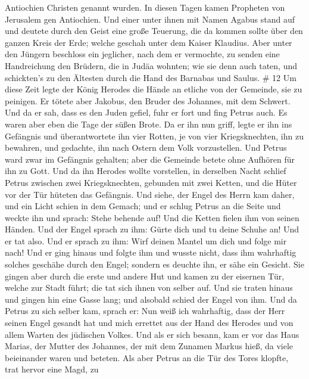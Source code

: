 Antiochien Christen genannt wurden.  In diesen Tagen kamen
Propheten von Jerusalem gen Antiochien.  Und einer unter
ihnen mit Namen Agabus stand auf und deutete durch den Geist eine große
Teuerung, die da kommen sollte über den ganzen Kreis der Erde; welche
geschah unter dem Kaiser Klaudius.  Aber unter den Jüngern
beschloss ein jeglicher, nach dem er vermochte, zu senden eine
Handreichung den Brüdern, die in Judäa wohnten;  wie sie
denn auch taten, und schickten's zu den Ältesten durch die Hand des
Barnabas und Saulus. \# 12  Um diese Zeit legte der König
Herodes die Hände an etliche von der Gemeinde, sie zu peinigen.
 Er tötete aber Jakobus, den Bruder des Johannes, mit dem
Schwert.  Und da er sah, dass es den Juden gefiel, fuhr er
fort und fing Petrus auch. Es waren aber eben die Tage der süßen Brote.
 Da er ihn nun griff, legte er ihn ins Gefängnis und
überantwortete ihn vier Rotten, je von vier Kriegsknechten, ihn zu
bewahren, und gedachte, ihn nach Ostern dem Volk vorzustellen.
 Und Petrus ward zwar im Gefängnis gehalten; aber die
Gemeinde betete ohne Aufhören für ihn zu Gott.  Und da ihn
Herodes wollte vorstellen, in derselben Nacht schlief Petrus zwischen
zwei Kriegsknechten, gebunden mit zwei Ketten, und die Hüter vor der Tür
hüteten das Gefängnis.  Und siehe, der Engel des Herrn kam
daher, und ein Licht schien in dem Gemach; und er schlug Petrus an die
Seite und weckte ihn und sprach: Stehe behende auf! Und die Ketten
fielen ihm von seinen Händen.  Und der Engel sprach zu ihm:
Gürte dich und tu deine Schuhe an! Und er tat also. Und er sprach zu
ihm: Wirf deinen Mantel um dich und folge mir nach!  Und er
ging hinaus und folgte ihm und wusste nicht, dass ihm wahrhaftig solches
geschähe durch den Engel; sondern es deuchte ihn, er sähe ein Gesicht.
 Sie gingen aber durch die erste und andere Hut und kamen
zu der eisernen Tür, welche zur Stadt führt; die tat sich ihnen von
selber auf. Und sie traten hinaus und gingen hin eine Gasse lang; und
alsobald schied der Engel von ihm.  Und da Petrus zu sich
selber kam, sprach er: Nun weiß ich wahrhaftig, dass der Herr seinen
Engel gesandt hat und mich errettet aus der Hand des Herodes und von
allem Warten des jüdischen Volkes.  Und als er sich besann,
kam er vor das Haus Marias, der Mutter des Johannes, der mit dem Zunamen
Markus hieß, da viele beieinander waren und beteten.  Als
aber Petrus an die Tür des Tores klopfte, trat hervor eine Magd, zu
